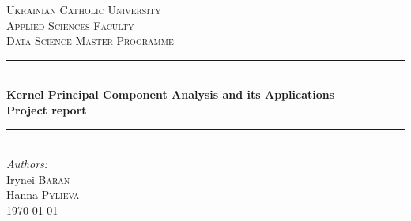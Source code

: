 \begin{titlepage}

\newcommand{\HRule}{\rule{\linewidth}{0.5mm}} %

\center %
 

\textsc{\LARGE Ukrainian Catholic University}\\[1cm] %
\textsc{\Large Applied Sciences Faculty}\\[0.5cm] %
\textsc{\large Data Science Master Programme}\\[0.5cm] %


\HRule \\[0.4cm]
{ \huge \bfseries Kernel Principal Component Analysis and its Applications}\\[10pt]
{\Large \bfseries Project report}\\[0.4cm] %
\HRule \\[1cm]
 


\Large \emph{Authors:}\\
Irynei \textsc{Baran}\\Hanna \textsc{Pylieva}\\[1cm] %


{\large \today}\\[2cm] %


\end{titlepage}
